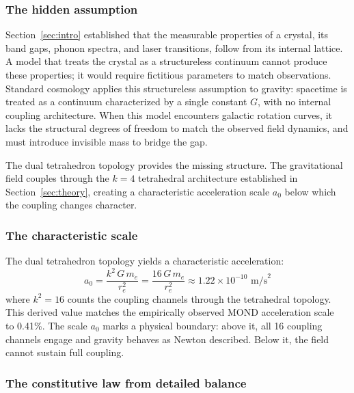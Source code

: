 \documentclass[aps,prd,preprint,superscriptaddress,showpacs,preprintnumbers,amsmath,amssymb,nofootinbib]{revtex4-2}
\begin{document}
\subsubsection*{The hidden assumption}

Section~\ref{sec:intro} established that the measurable properties of a crystal, its band gaps, phonon spectra, and laser transitions, follow from its internal lattice. A model that treats the crystal as a structureless continuum cannot produce these properties; it would require fictitious parameters to match observations. Standard cosmology applies this structureless assumption to gravity: spacetime is treated as a continuum characterized by a single constant $G$, with no internal coupling architecture. When this model encounters galactic rotation curves, it lacks the structural degrees of freedom to match the observed field dynamics, and must introduce invisible mass to bridge the gap.

The dual tetrahedron topology provides the missing structure. The gravitational field couples through the $k = 4$ tetrahedral architecture established in Section~\ref{sec:theory}, creating a characteristic acceleration scale $a_0$ below which the coupling changes character.

\subsubsection*{The characteristic scale}

The dual tetrahedron topology yields a characteristic acceleration:
\begin{equation}
a_0 = \frac{k^2 \, G \, m_e}{r_e^2} = \frac{16 \, G \, m_e}{r_e^2} \approx 1.22 \times 10^{-10} \text{ m/s}^2
\label{eq:a0-dm}
\end{equation}
where $k^2 = 16$ counts the coupling channels through the tetrahedral topology. This derived value matches the empirically observed MOND acceleration scale~\cite{milgrom1983} to 0.41\%. The scale $a_0$ marks a physical boundary: above it, all 16 coupling channels engage and gravity behaves as Newton described. Below it, the field cannot sustain full coupling.

\subsubsection*{The constitutive law from detailed balance}
\end{document}

